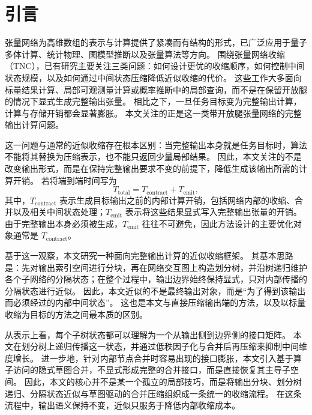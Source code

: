 \section{引言}

张量网络为高维数组的表示与计算提供了紧凑而有结构的形式，已广泛应用于量子多体计算、统计物理、图模型推断以及张量算法等方向\cite{orus2014practical}。
围绕张量网络收缩（TNC），已有研究主要关注三类问题：如何设计更优的收缩顺序，如何控制中间状态规模，以及如何通过中间状态压缩降低近似收缩的代价\cite{markov2008simulating,dumitrescu2018benchmarking,jakes2019carving,gray2021hyperoptimized,huang2021efficient,pan2020contracting,gray2024hyperoptimized,ma2024approximate}。
这些工作大多面向标量结果计算、局部可观测量计算或概率推断中的局部查询，而不是在保留开放腿的情况下显式生成完整输出张量\cite{orus2014practical,dechter1998bucket,pan2020contracting,heddes2026approximating}。
相比之下，一旦任务目标变为完整输出计算，计算与存储开销都会显著膨胀\cite{jakes2019carving}。
本文关注的正是这一类带开放腿张量网络的完整输出计算问题。

这一问题与通常的近似收缩存在根本区别：当完整输出本身就是任务目标时，算法不能将其替换为压缩表示，也不能只返回少量局部结果。
因此，本文关注的不是改变输出形式，而是在保持完整输出要求不变的前提下，降低生成该输出所需的计算开销。
若将端到端时间写为
\[
T_{\mathrm{total}} = T_{\mathrm{contract}} + T_{\mathrm{emit}},
\]
其中，$T_{\mathrm{contract}}$ 表示生成目标输出之前的内部计算开销，包括网络内部的收缩、合并以及相关中间状态处理；$T_{\mathrm{emit}}$ 表示将这些结果显式写入完整输出张量的开销。
由于完整输出本身必须被生成，$T_{\mathrm{emit}}$ 往往不可避免，因此方法设计的主要优化对象通常是 $T_{\mathrm{contract}}$。

基于这一观察，本文研究一种面向完整输出计算的近似收缩框架。
其基本思路是：先对输出索引空间进行分块，再在网络交互图上构造划分树，并沿树递归维护各个子网络的分隔状态；在整个过程中，输出边界始终保持显式，只对内部传播的分隔状态进行近似。
因此，本文近似的不是最终输出对象，而是“为了得到该输出而必须经过的内部中间状态”。
这也是本文与直接压缩输出端的方法，以及以标量收缩为目标的方法之间最本质的区别。

从表示上看，每个子树状态都可以理解为一个从输出侧到边界侧的接口矩阵。
本文在划分树上递归传播这一状态，并通过低秩因子化与合并后再压缩来抑制中间维度增长。
进一步地，针对内部节点合并时容易出现的接口膨胀，本文引入基于算子访问的隐式草图合并，不显式形成完整的合并接口，而是直接恢复其主导子空间。
因此，本文的核心并不是某一个孤立的局部技巧，而是将输出分块、划分树递归、分隔状态近似与草图驱动的合并压缩组织成一条统一的收缩流程。
在这条流程中，输出语义保持不变，近似只服务于降低内部收缩成本。

